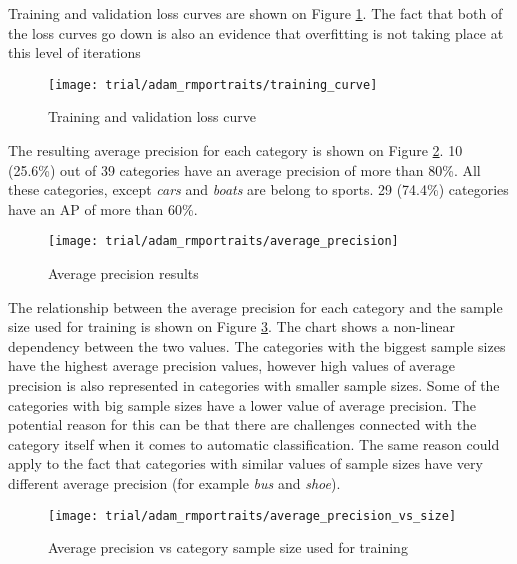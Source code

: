     Training and validation loss curves are shown on Figure \ref{fig:trial-training-curve}. The fact that both of the loss curves go down is also an evidence that overfitting is not taking place at this level of iterations
    
    \begin{figure}[H]
        \centering
        \texttt{[image: trial/adam\_rmportraits/training\_curve]}
        \caption[Trial experiment. Training and validation loss curve]{Training and validation loss curve}
        \label{fig:trial-training-curve}
    \end{figure}
    
    The resulting average precision for each category is shown on Figure \ref{fig:trial-average-precision}. 10 (25.6\%) out of 39 categories have an average precision of more than 80\%. All these categories, except \textit{cars} and \textit{boats} are belong to sports. 29 (74.4\%) categories have an AP of more than 60\%.

    \begin{figure}[H]
        \centering
        \texttt{[image: trial/adam\_rmportraits/average\_precision]}
        \caption[Trial experiment. Average precision results]{Average precision results}
        \label{fig:trial-average-precision}
    \end{figure}
    
    The relationship between the average precision for each category and the sample size used for training is shown on Figure \ref{fig:trial-average-precision-vs-size}. The chart shows a non-linear dependency between the two values. The categories with the biggest sample sizes have the highest average precision values, however high values of average precision is also represented in categories with smaller sample sizes. Some of the categories with big sample sizes have a lower value of average precision. The potential reason for this can be that there are challenges connected with the category itself when it comes to automatic classification. The same reason could apply to the fact that categories with similar values of sample sizes have very different average precision (for example \textit{bus} and \textit{shoe}).
    
    \begin{figure}[H]
        \centering
        \texttt{[image: trial/adam\_rmportraits/average\_precision\_vs\_size]}
        \caption[Trial experiment. Average precision vs category sample size used for training]{Average precision vs category sample size used for training}
        \label{fig:trial-average-precision-vs-size}
    \end{figure}
    
